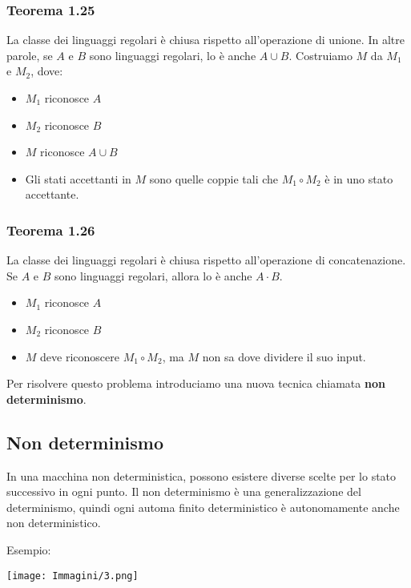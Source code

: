 \documentclass{article}
\begin{document}
\subsubsection{Teorema 1.25}
La classe dei linguaggi regolari è chiusa rispetto all'operazione di unione. In altre parole, se $A$ e $B$ sono linguaggi regolari, lo è anche $A \cup B$.
Costruiamo $M$ da $M_{1}$ e $M_{2}$, dove:
\begin{itemize}
    \item $M_1$ riconosce $A$
    \item $M_2$ riconosce $B$
    \item $M$ riconosce $A \cup B$
    \item Gli stati accettanti in $M$ sono quelle coppie tali che $M_{1}\circ M_{2}$ è in uno stato accettante.
\end{itemize}


\subsubsection{Teorema 1.26}
La classe dei linguaggi regolari è chiusa rispetto all'operazione di concatenazione. Se $A$ e $B$ sono linguaggi regolari, allora lo è anche $A \cdot B$.

\begin{itemize}
    \item $M_1$ riconosce $A$
    \item $M_2$ riconosce $B$
    \item $M$ deve riconoscere $M_1 \circ M_2$, ma $M$ non sa dove dividere il suo input.
\end{itemize}

Per risolvere questo problema introduciamo una nuova tecnica chiamata \textbf{non determinismo}.

\subsection{Non determinismo}

In una macchina non deterministica, possono esistere diverse scelte per lo stato successivo in ogni punto.
Il non determinismo è una generalizzazione del determinismo, quindi ogni automa finito deterministico è autonomamente anche non deterministico.

Esempio:

\begin{center}
    \texttt{[image: Immagini/3.png]}
\end{center}
\end{document}
